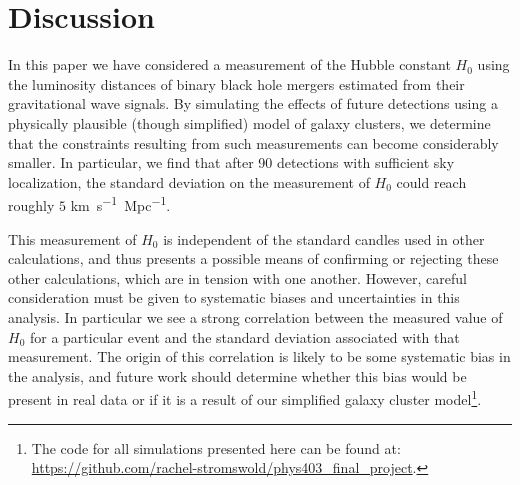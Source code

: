 \section{Discussion} \label{sec:conclusions}

In this paper we have considered a measurement of the Hubble constant $H_0$ using the luminosity distances of binary black hole mergers estimated from their gravitational wave signals.
By simulating the effects of future detections using a physically plausible (though simplified) model of galaxy clusters, we determine that the constraints resulting from such measurements can become considerably smaller.
In particular, we find that after 90 detections with sufficient sky localization, the standard deviation on the measurement of $H_0$ could reach roughly $5$ \si{km.s^{-1}.Mpc^{-1}}.

This measurement of $H_0$ is independent of the standard candles used in other calculations, and thus presents a possible means of confirming or rejecting these other calculations, which are in tension with one another.
However, careful consideration must be given to systematic biases and uncertainties in this analysis.
In particular we see a strong correlation between the measured value of $H_0$ for a particular event and the standard deviation associated with that measurement.
The origin of this correlation is likely to be some systematic bias in the analysis, and future work should determine whether this bias would be present in real data or if it is a result of our simplified galaxy cluster model\footnote{The code for all simulations presented here can be found at: \href{https://github.com/rachel-stromswold/phys403_final_project}{\url{https://github.com/rachel-stromswold/phys403_final_project}}.}.


